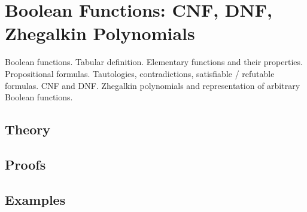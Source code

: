 
\section{Boolean Functions: CNF, DNF, Zhegalkin Polynomials}
\label{sec:2.3a.01-boolean-functions}

\begin{ticket}
Boolean functions. Tabular definition. Elementary functions and their properties. Propositional formulas. Tautologies, contradictions, satisfiable / refutable formulas. CNF and DNF. Zhegalkin polynomials and representation of arbitrary Boolean functions.
\end{ticket}

\subsection*{Theory}

\subsection*{Proofs}

\subsection*{Examples}
